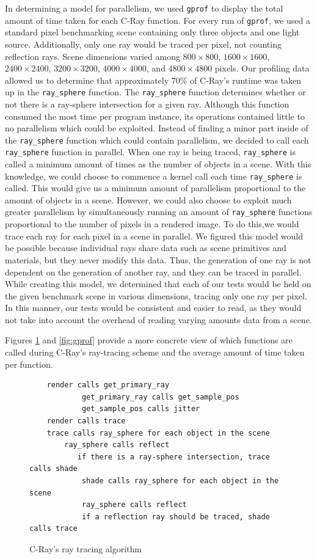 \documentclass[12pt]{article}
\begin{document}
In determining a model for parallelism, we used \texttt{gprof} to display the total amount of time taken for each C-Ray function. For every run of \texttt{gprof}, we used a standard pixel benchmarking scene containing only three objects and one light source. Additionally, only one ray would be traced per pixel, not counting reflection rays. Scene dimensions varied among $800\times 800$, $1600 \times 1600$, $2400 \times 2400$, $3200 \times 3200$, $4000 \times 4000$, and $4800 \times 4800$ pixels. Our profiling data allowed us to determine that approximately 70\% of C-Ray’s runtime was taken up in the \texttt{ray\_sphere} function. The \texttt{ray\_sphere} function determines whether or not there is a ray-sphere intersection for a given ray. Although this function consumed the most time per program instance, its operations contained little to no parallelism which could be exploited. Instead of finding a minor part inside of the \texttt{ray\_sphere} function which could contain parallelism, we decided to call each \texttt{ray\_sphere} function in parallel. When one ray is being traced, \texttt{ray\_sphere} is called a minimum amount of times as the number of objects in a scene. With this knowledge, we could choose to commence a kernel call each time \texttt{ray\_sphere} is called. This would give us a minimum amount of parallelism proportional to the amount of objects in a scene. However, we could also choose to exploit much greater parallelism by simultaneously running an amount of \texttt{ray\_sphere} functions proportional to the number of pixels in a rendered image. To do this,we would trace each ray for each pixel in a scene in parallel. We figured this model would be possible because individual rays share data such as scene primitives and materials, but they never modify this data. Thus, the generation of one ray is not dependent on the generation of another ray, and they can be traced in parallel. While creating this model, we determined that each of our tests would be held on the given benchmark scene in various dimensions, tracing only one ray per pixel. In this manner, our tests would be consistent and easier to read, as they would not take into account the overhead of reading varying amounts data from a scene.

Figures \ref{code:c-ray} and \ref{fig:gprof} provide a more concrete view of which functions are called during C-Ray’s ray-tracing scheme and the average amount of time taken per function.

\begin{figure}
    \caption{C-Ray's ray tracing algorithm} \label{code:c-ray}
    \begin{lstlisting}
    render calls get_primary_ray
            get_primary_ray calls get_sample_pos
            get_sample_pos calls jitter
    render calls trace
    trace calls ray_sphere for each object in the scene
        ray_sphere calls reflect
           if there is a ray-sphere intersection, trace calls shade
            shade calls ray_sphere for each object in the scene
            ray_sphere calls reflect
            if a reflection ray should be traced, shade calls trace
    \end{lstlisting}
\end{figure}
\end{document}
